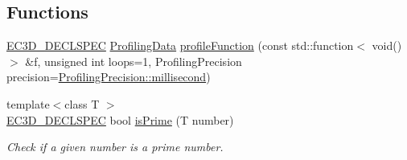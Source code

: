 \subsection*{Functions}
\begin{DoxyCompactItemize}
\item 
\mbox{\hyperlink{_common_8h_aac42573e202ca3dd4d259c81691e2369}{E\+C3\+D\+\_\+\+D\+E\+C\+L\+S\+P\+EC}} \mbox{\hyperlink{structec_1_1_profiling_data}{Profiling\+Data}} \mbox{\hyperlink{namespaceec_a9cbcabe8cfdb73cc1b1bf12985d0bb49}{profile\+Function}} (const std\+::function$<$ void()$>$ \&f, unsigned int loops=1, Profiling\+Precision precision=\mbox{\hyperlink{_profiler_8h_ad14d98cdcfa4397ac3a0af6ce942c55d}{Profiling\+Precision\+::millisecond}})
\item 
{\footnotesize template$<$class T $>$ }\\\mbox{\hyperlink{_common_8h_aac42573e202ca3dd4d259c81691e2369}{E\+C3\+D\+\_\+\+D\+E\+C\+L\+S\+P\+EC}} bool \mbox{\hyperlink{namespaceec_a56b1f3bdf5dbaf491d466504cdcfd972}{is\+Prime}} (T number)
\begin{DoxyCompactList}\small\item\em Check if a given number is a prime number. \end{DoxyCompactList}\end{DoxyCompactItemize}

